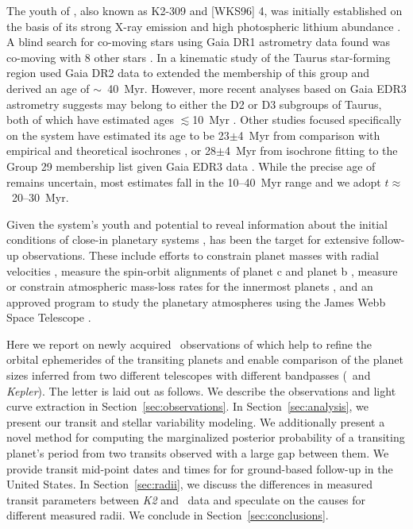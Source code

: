 \documentclass[twocolumn]{aastex631}
\begin{document}
The youth of \sname, also known as K2-309 and [WKS96] 4, was initially established on the basis of its strong X-ray emission \citep{Wichmann1996} and high photospheric lithium abundance \citep{Wichmann2000}. A blind search for co-moving stars using Gaia DR1 astrometry data found \sname was co-moving with 8 other stars \citep[Group 29 in][]{Oh2017}. In a kinematic study of the Taurus star-forming region \citet{Luhman2018} used Gaia DR2 data to extended the membership of this group and derived an age of $\sim$~40~Myr. However, more recent analyses based on Gaia EDR3 astrometry suggests \sname may belong to either the D2 or D3 subgroups of Taurus, both of which have estimated ages $\lesssim$10~Myr \citep{gaidos21, Krolikowski2021}. Other studies focused specifically on the \sname system have estimated its age to be 23$\pm$4~Myr from comparison with empirical and theoretical isochrones \citep{David2019b}, or 28$\pm$4~Myr from isochrone fitting to the \citet{Luhman2018} Group 29 membership list given Gaia EDR3 data \citep{johnson21}. While the precise age of \sname remains uncertain, most estimates fall in the 10--40~Myr range and we adopt $t \approx$~20--30~Myr.

Given the system's youth and potential to reveal information about the initial conditions of close-in planetary systems \citep[e.g.][]{Poppenhaeger2021, Owen2020}, \sname has been the target for extensive follow-up observations. These include efforts to constrain planet masses with radial velocities \citep{Beichman2019}, measure the spin-orbit alignments of planet c \citep{Feinstein21} and planet b \citep{johnson21, gaidos21}, measure or constrain atmospheric mass-loss rates for the innermost planets \citep{Schlawin21, Vissapragada21}, and an approved program to study the planetary atmospheres using the James Webb Space Telescope \citep[JWST;][]{Desert2021}.

Here we report on newly acquired \tess\ observations of \sname which help to refine the orbital ephemerides of the transiting planets and enable comparison of the planet sizes inferred from two different telescopes with different bandpasses (\tess\ and \textit{Kepler}). The letter is laid out as follows. We describe the observations and light curve extraction in Section~\ref{sec:observations}. In Section~\ref{sec:analysis}, we present our transit and stellar variability modeling. We additionally present a novel method for computing the marginalized posterior probability of a transiting planet's period from two transits observed with a large gap between them. We provide transit mid-point dates and times for \planete for ground-based follow-up in the United States. In Section~\ref{sec:radii}, we discuss the differences in measured transit parameters between \textit{K2} and \tess\ data and speculate on the causes for different measured radii. We conclude in Section~\ref{sec:conclusions}.
\end{document}
